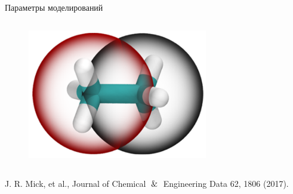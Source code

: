 \documentclass{beamer} %
\begin{document}
\begin{frame}{Параметры моделирований}
{\begin{columns}
\begin{column}{0.5\linewidth}
        \vspace{1.0cm}

        \begin{figure}
          \centering
          \includegraphics[width=0.7\textwidth]{ethane2.png}
        \end{figure}

        \vspace{0.5cm}

      \end{column}
    \end{columns}
  }

  \tiny{J. R. Mick, et al., Journal of Chemical $\And$ Engineering Data 62, 1806 (2017).}

\end{frame}
\end{document}
